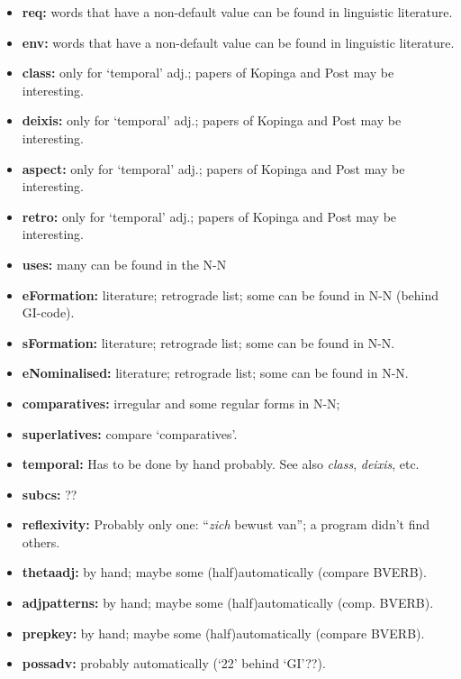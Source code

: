 \begin{itemize}
\item {\bf req:} words that have a non-default value can be found in 
        linguistic literature.

\item {\bf env:} words that have a non-default value can be found in 
        linguistic literature.

\item {\bf class:} only for `temporal' adj.; papers of Kopinga and Post may be
      interesting.

\item {\bf deixis:} only for `temporal' adj.; papers of Kopinga and Post may be
      interesting.

\item {\bf aspect:} only for `temporal' adj.; papers of Kopinga and Post may be
      interesting.

\item {\bf retro:} only for `temporal' adj.; papers of Kopinga and Post may be
      interesting.

\item {\bf uses:} many can be found in the N-N

\item {\bf eFormation:} literature; retrograde list; some can be found in N-N
      (behind GI-code).

\item {\bf sFormation:} literature; retrograde list; some can be found in N-N.

\item {\bf eNominalised:} literature; retrograde list; some can be found in N-N.

\item {\bf comparatives:} irregular and some regular forms in N-N;

\item {\bf superlatives:} compare `comparatives'.

\item {\bf temporal:} Has to be done by hand probably. See also {\em class}, 
      {\em deixis}, etc. 

\item {\bf subcs:} ??

\item {\bf reflexivity:} Probably only one: ``{\em zich} bewust van''; 
      a program didn't find others. 

\item {\bf thetaadj:} by hand; maybe some (half)automatically (compare BVERB).

\item {\bf adjpatterns:} by hand; maybe some (half)automatically (comp. BVERB).

\item {\bf prepkey:} by hand; maybe some (half)automatically (compare BVERB).

\item {\bf possadv:} probably automatically (`22' behind `GI'??).
\end{itemize}

